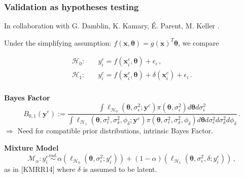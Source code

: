 \documentclass[nopagenumber,9pt]{beamer}
\newcommand{\btheta}{\boldsymbol{\theta}}
\newcommand{\by}{\mathbf{y}}
\newcommand{\bx}{\mathbf{x}}
\newcommand{\bxf}{\bx^e}
\newcommand{\yf}{y^e}
\newcommand{\byf}{\by^e}
\newcommand{\citemano}[1]{\textcolor{dgreen}{#1}}
\begin{document}
\begin{frame}
 \frametitle{Validation as hypotheses testing}
 
 In collaboration with G. Damblin, K. Kamary, É. Parent, M. Keller \cite{damblin2016bayesian,kaniav}.
 
 \bigskip
 
 
  Under the simplifying assumption: $f(\bx,\btheta)=g(\bx)^T \btheta$, we compare
 
 \begin{align*}
 \mathcal{H}_0:\quad & \yf_i = f(\bxf_i,{\btheta}) + \epsilon_i\,,\\
 \mathcal{H}_1:\quad & \yf_i = f(\bxf_i,{\btheta}) + \delta(\bxf_i) + \epsilon_i\,.\\
\end{align*}
%  
 
 \textbf{Bayes Factor}
 $$B_{0,1}(\byf):=\frac
{\int \ell_{\mathcal H_0}(\btheta ,\sigma_\epsilon^2;\byf )\pi(\btheta ,\sigma_\epsilon^2)d \btheta d\sigma_\epsilon^2}
{\int \ell_{\mathcal H_1}(\btheta ,\sigma_\epsilon^2,\sigma_\delta^2,\phi_\delta;\byf )\pi(\btheta ,\sigma_\epsilon^2,\sigma_\delta^2,\phi_\delta)d \btheta d\sigma_\epsilon^2d\sigma_\delta^2d\phi_\delta}\,.$$
$\Rightarrow$ Need for compatible prior distributions, intrinsic Bayes Factor. 


\bigskip


\textbf{Mixture Model}
 \begin{equation*}\label{eq:mixture}
\mathcal M_\alpha: \yf_i\overset{ind.}{\sim} \alpha \left(\ell_{\mathcal H_0}(\btheta, \sigma_\epsilon^2;\yf_i)\right)+(1-\alpha)\left(\ell_{\mathcal H_1}(\btheta, \sigma_\epsilon^2, \delta;\yf_i)\right)\,,
\end{equation*}
 as in \citemano{[KMRR14]} where $\delta$ is assumed to be latent.
 
\end{frame}
\end{document}

